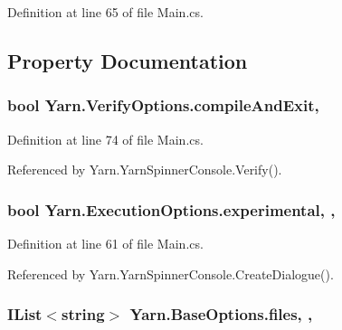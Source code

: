 Definition at line 65 of file Main.\-cs.



\subsection{Property Documentation}
\hypertarget{a00182_af9b6917244075618720f2a90bbe6ef56}{
\subsubsection[{compile\-And\-Exit}]{\setlength{\rightskip}{0pt plus 5cm}bool Yarn.\-Verify\-Options.\-compile\-And\-Exit\hspace{0.3cm}{\ttfamily [get]}, {\ttfamily [set]}}}\label{a00182_af9b6917244075618720f2a90bbe6ef56}


Definition at line 74 of file Main.\-cs.



Referenced by Yarn.\-Yarn\-Spinner\-Console.\-Verify().

\hypertarget{a00093_ad97950e47ce2aaeb598295b7c3c44b13}{
\subsubsection[{experimental}]{\setlength{\rightskip}{0pt plus 5cm}bool Yarn.\-Execution\-Options.\-experimental\hspace{0.3cm}{\ttfamily [get]}, {\ttfamily [set]}, {\ttfamily [inherited]}}}\label{a00093_ad97950e47ce2aaeb598295b7c3c44b13}


Definition at line 61 of file Main.\-cs.



Referenced by Yarn.\-Yarn\-Spinner\-Console.\-Create\-Dialogue().

\hypertarget{a00031_aa93cbb1bc1d5328e0a417012621e92d2}{
\subsubsection[{files}]{\setlength{\rightskip}{0pt plus 5cm}I\-List$<$string$>$ Yarn.\-Base\-Options.\-files\hspace{0.3cm}{\ttfamily [get]}, {\ttfamily [set]}, {\ttfamily [inherited]}}}\label{a00031_aa93cbb1bc1d5328e0a417012621e92d2}


